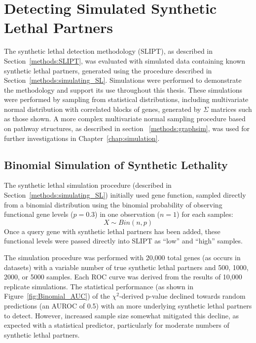 \FloatBarrier

\section{Detecting Simulated Synthetic Lethal Partners} \label{chapt2:simulation_2015}

The \gls{synthetic lethal} detection methodology (\gls{SLIPT}), as described in Section~\ref{methods:SLIPT}, was evaluated with simulated data containing known \gls{synthetic lethal} partners, generated using the procedure described in Section~\ref{methods:simulating_SL}. Simulations were performed to demonstrate the methodology and support its use throughout this thesis. These simulations were performed by sampling from statistical distributions, including multivariate normal distribution with correlated blocks of genes, generated by $\Sigma$ matrices such as those shown. A more complex multivariate normal sampling procedure based on pathway  structures, as described in section ~\ref{methods:graphsim}, was used for further investigations in Chapter~\ref{chap:simulation}. 

\subsection{Binomial Simulation of Synthetic Lethality} \label{chapt2:simulation_binom}

The \gls{synthetic lethal} simulation procedure (described in Section~\ref{methods:simulating_SL}) initially used gene function, sampled directly from a binomial distribution using the binomial probability of observing functional gene levels ($p = 0.3$) in one observation ($n = 1$) for each samples: $$X\sim Bin(n,p)$$  Once a query gene with \gls{synthetic lethal} partners has been added, these functional levels were passed directly into \gls{SLIPT} as ``low'' and ``high'' samples.

The simulation procedure was performed with 20,000 total genes (as occurs in  datasets) with a variable number of true \gls{synthetic lethal} partners and 500, 1000, 2000, or 5000 samples. Each \gls{ROC} curve was derived from the results of 10,000 replicate simulations. The statistical performance (as shown in Figure~\ref{fig:Binomial_AUC}) of the $\chi^2$-derived p-value declined towards random predictions (an \gls{AUROC} of 0.5) with an more underlying \gls{synthetic lethal} partners to detect. However, increased sample size somewhat mitigated this decline, as expected with a statistical predictor, particularly for moderate numbers of \gls{synthetic lethal} partners. 


